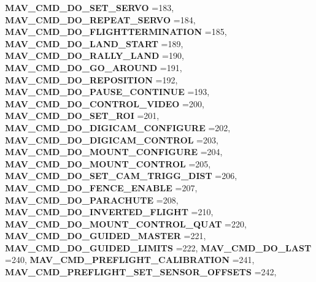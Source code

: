 \begin{DoxyCompactItemize}
\textbf{ M\+A\+V\+\_\+\+C\+M\+D\+\_\+\+D\+O\+\_\+\+S\+E\+T\+\_\+\+S\+E\+R\+VO} =183, 
\textbf{ M\+A\+V\+\_\+\+C\+M\+D\+\_\+\+D\+O\+\_\+\+R\+E\+P\+E\+A\+T\+\_\+\+S\+E\+R\+VO} =184, 
\textbf{ M\+A\+V\+\_\+\+C\+M\+D\+\_\+\+D\+O\+\_\+\+F\+L\+I\+G\+H\+T\+T\+E\+R\+M\+I\+N\+A\+T\+I\+ON} =185, 
\textbf{ M\+A\+V\+\_\+\+C\+M\+D\+\_\+\+D\+O\+\_\+\+L\+A\+N\+D\+\_\+\+S\+T\+A\+RT} =189, 
\newline
\textbf{ M\+A\+V\+\_\+\+C\+M\+D\+\_\+\+D\+O\+\_\+\+R\+A\+L\+L\+Y\+\_\+\+L\+A\+ND} =190, 
\textbf{ M\+A\+V\+\_\+\+C\+M\+D\+\_\+\+D\+O\+\_\+\+G\+O\+\_\+\+A\+R\+O\+U\+ND} =191, 
\textbf{ M\+A\+V\+\_\+\+C\+M\+D\+\_\+\+D\+O\+\_\+\+R\+E\+P\+O\+S\+I\+T\+I\+ON} =192, 
\textbf{ M\+A\+V\+\_\+\+C\+M\+D\+\_\+\+D\+O\+\_\+\+P\+A\+U\+S\+E\+\_\+\+C\+O\+N\+T\+I\+N\+UE} =193, 
\newline
\textbf{ M\+A\+V\+\_\+\+C\+M\+D\+\_\+\+D\+O\+\_\+\+C\+O\+N\+T\+R\+O\+L\+\_\+\+V\+I\+D\+EO} =200, 
\textbf{ M\+A\+V\+\_\+\+C\+M\+D\+\_\+\+D\+O\+\_\+\+S\+E\+T\+\_\+\+R\+OI} =201, 
\textbf{ M\+A\+V\+\_\+\+C\+M\+D\+\_\+\+D\+O\+\_\+\+D\+I\+G\+I\+C\+A\+M\+\_\+\+C\+O\+N\+F\+I\+G\+U\+RE} =202, 
\textbf{ M\+A\+V\+\_\+\+C\+M\+D\+\_\+\+D\+O\+\_\+\+D\+I\+G\+I\+C\+A\+M\+\_\+\+C\+O\+N\+T\+R\+OL} =203, 
\newline
\textbf{ M\+A\+V\+\_\+\+C\+M\+D\+\_\+\+D\+O\+\_\+\+M\+O\+U\+N\+T\+\_\+\+C\+O\+N\+F\+I\+G\+U\+RE} =204, 
\textbf{ M\+A\+V\+\_\+\+C\+M\+D\+\_\+\+D\+O\+\_\+\+M\+O\+U\+N\+T\+\_\+\+C\+O\+N\+T\+R\+OL} =205, 
\textbf{ M\+A\+V\+\_\+\+C\+M\+D\+\_\+\+D\+O\+\_\+\+S\+E\+T\+\_\+\+C\+A\+M\+\_\+\+T\+R\+I\+G\+G\+\_\+\+D\+I\+ST} =206, 
\textbf{ M\+A\+V\+\_\+\+C\+M\+D\+\_\+\+D\+O\+\_\+\+F\+E\+N\+C\+E\+\_\+\+E\+N\+A\+B\+LE} =207, 
\newline
\textbf{ M\+A\+V\+\_\+\+C\+M\+D\+\_\+\+D\+O\+\_\+\+P\+A\+R\+A\+C\+H\+U\+TE} =208, 
\textbf{ M\+A\+V\+\_\+\+C\+M\+D\+\_\+\+D\+O\+\_\+\+I\+N\+V\+E\+R\+T\+E\+D\+\_\+\+F\+L\+I\+G\+HT} =210, 
\textbf{ M\+A\+V\+\_\+\+C\+M\+D\+\_\+\+D\+O\+\_\+\+M\+O\+U\+N\+T\+\_\+\+C\+O\+N\+T\+R\+O\+L\+\_\+\+Q\+U\+AT} =220, 
\textbf{ M\+A\+V\+\_\+\+C\+M\+D\+\_\+\+D\+O\+\_\+\+G\+U\+I\+D\+E\+D\+\_\+\+M\+A\+S\+T\+ER} =221, 
\newline
\textbf{ M\+A\+V\+\_\+\+C\+M\+D\+\_\+\+D\+O\+\_\+\+G\+U\+I\+D\+E\+D\+\_\+\+L\+I\+M\+I\+TS} =222, 
\textbf{ M\+A\+V\+\_\+\+C\+M\+D\+\_\+\+D\+O\+\_\+\+L\+A\+ST} =240, 
\textbf{ M\+A\+V\+\_\+\+C\+M\+D\+\_\+\+P\+R\+E\+F\+L\+I\+G\+H\+T\+\_\+\+C\+A\+L\+I\+B\+R\+A\+T\+I\+ON} =241, 
\textbf{ M\+A\+V\+\_\+\+C\+M\+D\+\_\+\+P\+R\+E\+F\+L\+I\+G\+H\+T\+\_\+\+S\+E\+T\+\_\+\+S\+E\+N\+S\+O\+R\+\_\+\+O\+F\+F\+S\+E\+TS} =242, 

\end{DoxyCompactItemize}
